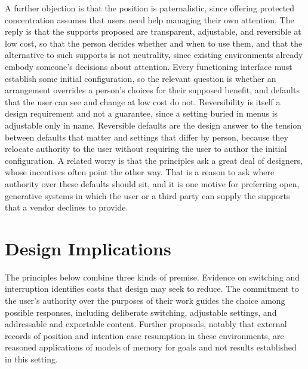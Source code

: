 \documentclass[12pt]{article}
\begin{document}
A further objection is that the position is paternalistic, since offering protected concentration assumes that users need help managing their own attention. The reply is that the supports proposed are transparent, adjustable, and reversible at low cost, so that the person decides whether and when to use them, and that the alternative to such supports is not neutrality, since existing environments already embody someone's decisions about attention. Every functioning interface must establish some initial configuration, so the relevant question is whether an arrangement overrides a person's choices for their supposed benefit, and defaults that the user can see and change at low cost do not. Reversibility is itself a design requirement and not a guarantee, since a setting buried in menus is adjustable only in name. Reversible defaults are the design answer to the tension between defaults that matter and settings that differ by person, because they relocate authority to the user without requiring the user to author the initial configuration. A related worry is that the principles ask a great deal of designers, whose incentives often point the other way. That is a reason to ask where authority over these defaults should sit, and it is one motive for preferring open, generative systems in which the user or a third party can supply the supports that a vendor declines to provide.

\section{Design Implications}

The principles below combine three kinds of premise. Evidence on switching and interruption identifies costs that design may seek to reduce. The commitment to the user's authority over the purposes of their work guides the choice among possible responses, including deliberate switching, adjustable settings, and addressable and exportable content. Further proposals, notably that external records of position and intention ease resumption in these environments, are reasoned applications of models of memory for goals and not results established in this setting.
\end{document}
